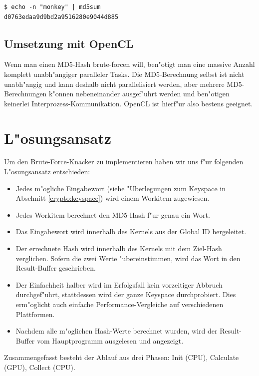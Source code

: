 \begin{refsection}
\begin{verbatim}
$ echo -n "monkey" | md5sum
d0763edaa9d9bd2a9516280e9044d885
\end{verbatim}

\subsection{Umsetzung mit OpenCL}

Wenn man einen MD5-Hash brute-forcen will, ben"otigt man eine massive Anzahl
komplett unabh"angiger paralleler Tasks. Die MD5-Berechnung selbst ist nicht
unabh"angig und kann deshalb nicht parallelisiert werden, aber mehrere
MD5-Berechnungen k"onnen nebeneinander ausgef"uhrt werden und ben"otigen
keinerlei Interprozess-Kommunikation. OpenCL ist hierf"ur also bestens geeignet.


\section{L"osungsansatz}
\label{crypto:loesungsansatz}


Um den Brute-Force-Knacker zu implementieren haben wir uns f"ur folgenden
L"osungsansatz entschieden:

\begin{itemize}
	\item Jedes m"ogliche Eingabewort (siehe "Uberlegungen zum Keyspace in
		Abschnitt \ref{crypto:keyspace}) wird einem Workitem zugewiesen.
	\item Jedes Workitem berechnet den MD5-Hash f"ur genau ein Wort.
	\item Das Eingabewort wird innerhalb des Kernels aus der Global ID
		hergeleitet.
	\item Der errechnete Hash wird innerhalb des Kernels mit dem Ziel-Hash
		verglichen. Sofern die zwei Werte "ubereinstimmen, wird das Wort in den
		Result-Buffer geschrieben.
	\item Der Einfachheit halber wird im Erfolgsfall kein vorzeitiger Abbruch
		durchgef"uhrt, stattdessen wird der ganze Keyspace durchprobiert. Dies
		erm"oglicht auch einfache Performance-Vergleiche auf verschiedenen
		Plattformen.
	\item Nachdem alle m"oglichen Hash-Werte berechnet wurden, wird der
		Result-Buffer vom Hauptprogramm ausgelesen und angezeigt.
\end{itemize}

\noindent Zusammengefasst besteht der Ablauf aus drei Phasen: Init (CPU),
Calculate (GPU), Collect (CPU).


\end{refsection}
